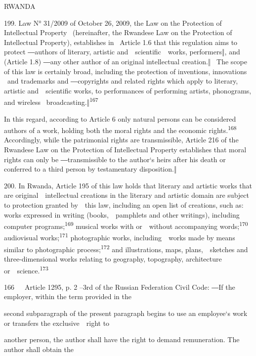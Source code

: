 \documentclass[
]{article}
\begin{document}
{RWANDA}

{199. }{Law N° 31/2009 of October 26, 2009, the }{Law on the Protection
of Intellectual Property }{~(hereinafter, the Rwandese }{Law on the
Protection of Intellectual Property)}{, establishes in }{~Article 1.6
that this regulation aims to protect ―}{authors of literary, artistic
and~~scientific~~works, performers}{‖, and (Article 1.8) ―}{any other
author of an original intellectual creation.}{‖ }{~The scope of this law
is certainly broad, including the protection of inventions, innovations
}{~and trademarks and ―}{copyrights and related rights which apply to
literary, artistic and~~scientific works, to performances of performing
artists, phonograms, and wireless
}{~broadcasting.‖}\textsuperscript{{167}}

{In this regard, according to Article 6 only natural persons can be
considered authors of a work, holding both the moral rights and the
economic rights.}\textsuperscript{{168 }}{Accordingly, while the
patrimonial rights are transmissible, Article 216 of the Rwandese }{Law
on the Protection of Intellectual Property }{establishes that moral
rights can only be ―}{transmissible to the }{author`s heirs after his
death or conferred to a third person by testamentary disposition.‖}

{200. }{In Rwanda, Article 195 of this law holds that literary and
artistic works that are original~~intellectual creations in the literary
and artistic domain are subject to protection granted by~~this law,
including an open list of creations, such as: works expressed in writing
(books,~~pamphlets and other writings), including computer
programs;}\textsuperscript{{169 }}{musical works with or~~without
accompanying words;}\textsuperscript{{170 }}{audiovisual
works;}\textsuperscript{{171 }}{photographic works, including~~works
made by means similar to photographic process;}\textsuperscript{{172
}}{and illustrations, maps, plans,~~sketches and three-dimensional works
relating to geography, topography, architecture
or~~science.}\textsuperscript{{173}}

{166}{~~~}{Article 1295, p. 2 }{--}{3rd of the Russian Federation
}{Civil Code}{: ―}{If the employer, within the term provided in the}

{second subparagraph of the present paragraph begins to use an
employee`s work or transfers the exclusive~~right to}

{another person, the author shall have the right to demand remuneration.
The author shall obtain the}
\end{document}
